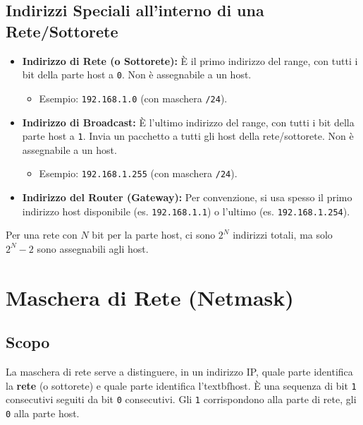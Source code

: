 \subsection{Indirizzi Speciali all'interno di una Rete/Sottorete}
\begin{itemize}
    \item \textbf{Indirizzo di Rete (o Sottorete):} È il primo indirizzo del range, con tutti i bit della parte host a \texttt{0}. Non è assegnabile a un host.
    \begin{itemize}
        \item Esempio: \texttt{192.168.1.0} (con maschera \texttt{/24}).
    \end{itemize}
    \item \textbf{Indirizzo di Broadcast:} È l'ultimo indirizzo del range, con tutti i bit della parte host a \texttt{1}. Invia un pacchetto a tutti gli host della rete/sottorete. Non è assegnabile a un host.
    \begin{itemize}
        \item Esempio: \texttt{192.168.1.255} (con maschera \texttt{/24}).
    \end{itemize}
    \item \textbf{Indirizzo del Router (Gateway):} Per convenzione, si usa spesso il primo indirizzo host disponibile (es. \texttt{192.168.1.1}) o l'ultimo (es. \texttt{192.168.1.254}).
\end{itemize}
Per una rete con $N$ bit per la parte host, ci sono $2^N$ indirizzi totali, ma solo $2^N - 2$ sono assegnabili agli host.

\section{Maschera di Rete (Netmask)}

\subsection{Scopo}
La maschera di rete serve a distinguere, in un indirizzo IP, quale parte identifica la \textbf{rete} (o sottorete) e quale parte identifica l'textbf{host}.
È una sequenza di bit \texttt{1} consecutivi seguiti da bit \texttt{0} consecutivi. Gli \texttt{1} corrispondono alla parte di rete, gli \texttt{0} alla parte host.

